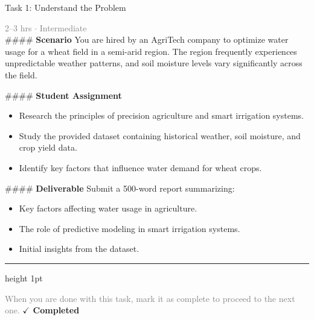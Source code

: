 \documentclass[10pt,a4paper]{article}
\begin{document}
\begin{taskbox}{Task 1: Understand the Problem}

    {\small \textcolor{gray}{2--3 hrs $\cdot$ Intermediate}}\\[12pt]

    \#\#\#\# \textbf{Scenario}  
You are hired by an AgriTech company to optimize water usage for a wheat field in a semi-arid region. The region frequently experiences unpredictable weather patterns, and soil moisture levels vary significantly across the field.

\#\#\#\# \textbf{Student Assignment}  
\begin{itemize}
    \item Research the principles of precision agriculture and smart irrigation systems.
    \item Study the provided dataset containing historical weather, soil moisture, and crop yield data.
    \item Identify key factors that influence water demand for wheat crops.
\end{itemize}

\#\#\#\# \textbf{Deliverable}  
Submit a 500-word report summarizing:
\begin{itemize}
    \item Key factors affecting water usage in agriculture.
    \item The role of predictive modeling in smart irrigation systems.
    \item Initial insights from the dataset.\par
\end{itemize}

    \vspace{16pt}

    \textcolor{cardBorder}{\hrule height 1pt}\vspace{8pt}

    \small \textcolor{gray}{When you are done with this task, mark it as complete to proceed to the next one.} \hfill \textbf{\textcolor{brandDark}{$\checkmark$ Completed}}

\end{taskbox}
\end{document}
